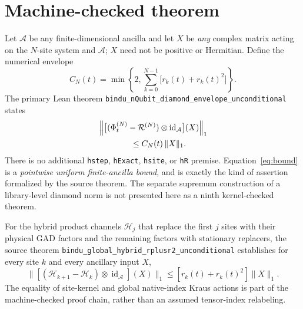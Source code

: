 \documentclass[aps,pra,reprint,superscriptaddress,amsmath,amssymb,floatfix,nofootinbib]{revtex4-2}
\newcommand{\id}{\operatorname{id}}
\newcommand{\R}{\mathcal{R}}
\newcommand{\Hyb}{\mathcal{H}}
\begin{document}
\section{Machine-checked theorem}
Let $\mathcal A$ be any finite-dimensional ancilla and let $X$ be \emph{any} complex matrix acting on the $N$-site system and $\mathcal A$; $X$ need not be positive or Hermitian. Define the numerical envelope
\begin{equation}
 C_N(t)=\min\left\{2,\sum_{k=0}^{N-1}\bigl[r_k(t)+r_k(t)^2\bigr]\right\}.
 \label{eq:envelope}
\end{equation}
The primary Lean theorem \texttt{bindu\_nQubit\_diamond\_envelope\_unconditional} states
\begin{align}
 &\left\|\bigl[(\Phi_t^{(N)}-\R^{(N)})\otimes\id_{\mathcal A}\bigr](X)\right\|_1\notag\\
 &\hspace{14mm}\le C_N(t)\,\|X\|_1.
 \label{eq:bound}
\end{align}
There is no additional \texttt{hstep}, \texttt{hExact}, \texttt{hsite}, or \texttt{hR} premise. Equation~\eqref{eq:bound} is a \emph{pointwise uniform finite-ancilla bound}, and is exactly the kind of assertion formalized by the source theorem. The separate supremum construction of a library-level diamond norm is not presented here as a ninth kernel-checked theorem.

For the hybrid product channels $\Hyb_j$ that replace the first $j$ sites with their physical GAD factors and the remaining factors with stationary replacers, the source theorem \texttt{bindu\_global\_hybrid\_rplusr2\_unconditional} establishes for every site $k$ and every ancillary input $X$,
\begin{equation}
 \|[(\Hyb_{k+1}-\Hyb_k)\otimes\id_{\mathcal A}](X)\|_1
 \le[r_k(t)+r_k(t)^2]\|X\|_1.
 \label{eq:step}
\end{equation}
The equality of site-kernel and global native-index Kraus actions is part of the machine-checked proof chain, rather than an assumed tensor-index relabeling.
\end{document}

